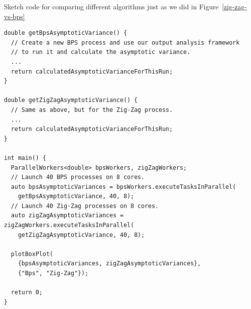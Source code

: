 \documentclass[report.tex]{subfiles}
\begin{document}
\begin{lstfloat}
\caption{Sketch code for comparing different algorithms just as we did in Figure~\ref{zig-zag-vs-bps}}
\label{bps-vs-zig-zag-code}
\begin{lstlisting}
double getBpsAsymptoticVariance() {
  // Create a new BPS process and use our output analysis framework
  // to run it and calculate the asymptotic variance.
  ...
  return calculatedAsymptoticVarianceForThisRun;
}

double getZigZagAsymptoticVariance() {
  // Same as above, but for the Zig-Zag process.
  ...
  return calculatedAsymptoticVarianceForThisRun;
}

int main() {
  ParallelWorkers<double> bpsWorkers, zigZagWorkers;
  // Launch 40 BPS processes on 8 cores.
  auto bpsAsymptoticVariances = bpsWorkers.executeTasksInParallel(
    getBpsAsymptoticVariance, 40, 8);
  // Launch 40 Zig-Zag processes on 8 cores.
  auto zigZagAsymptoticVariances = zigZagWorkers.executeTasksInParallel(
    getZigZagAsymptoticVariance, 40, 8);

  plotBoxPlot(
    {bpsAsymptoticVariances, zigZagAsymptoticVariances},
    {"Bps", "Zig-Zag"});

  return 0;
}
\end{lstlisting}
\end{lstfloat}
\end{document}
